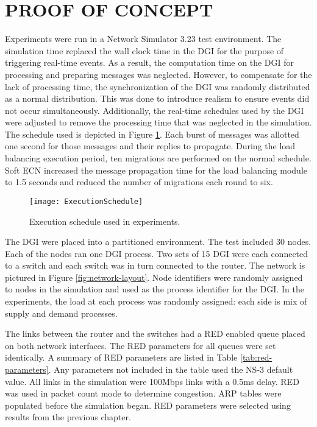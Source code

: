 \section{PROOF OF CONCEPT}
\label{sect:experimentalsetup}
Experiments were run in a Network Simulator 3.23\cite{NS3} test environment.
The simulation time replaced the wall clock time in the \ac{DGI} for the purpose of triggering real-time events.
As a result, the computation time on the \ac{DGI} for processing and preparing messages was neglected.
However, to compensate for the lack of processing time, the synchronization of the \ac{DGI} was randomly distributed as a normal distribution.
This was done to introduce realism to ensure events did not occur simultaneously.
Additionally, the real-time schedules used by the \ac{DGI} were adjusted to remove the processing time that was neglected in the simulation.
The schedule used is depicted in Figure \ref{fig:execution-schedule}.
Each burst of messages was allotted one second for those messages and their replies to propagate. During the load balancing execution period, ten migrations are performed on the normal schedule. Soft ECN increased the message propagation time for the load balancing module to 1.5 seconds and reduced the number of migrations each round to six.

\begin{figure}[htbp]
\centering
\texttt{[image: ExecutionSchedule]}
\caption{Execution schedule used in experiments. }
\label{fig:execution-schedule}
\end{figure}

The \ac{DGI} were placed into a partitioned environment.
The test included 30 nodes.
Each of the nodes ran one \ac{DGI} process.
Two sets of 15 \ac{DGI} were each connected to a switch and each switch was in turn connected to the router.
The network is pictured in Figure \ref{fig:network-layout}.
Node identifiers were randomly assigned to nodes in the simulation and used as the process identifier for the \ac{DGI}.
In the experiments, the load at each process was randomly assigned: each side is mix of supply and demand processes.

The links between the router and the switches had a \ac{RED} enabled queue placed on both network interfaces.
The \ac{RED} parameters for all queues were set identically.
A summary of \ac{RED} parameters are listed in Table \ref{tab:red-parameters}.
Any parameters not included in the table used the NS-3 default value.
All links in the simulation were 100Mbps links with a 0.5ms delay.
RED was used in packet count mode to determine congestion.
ARP tables were populated before the simulation began.
\ac{RED} parameters were selected using results from the previous chapter.

